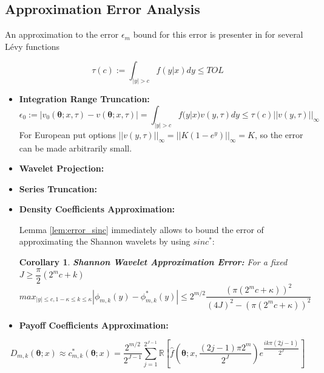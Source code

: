 \documentclass[12,twoside]{mammeTFM}
\newtheorem{cor}[thm]{Corollary}
\theoremstyle{definition}
\theoremstyle{remark}
\newcommand{\R}{\ensuremath{\mathbb{R}}}
\begin{document}
\subsection{Approximation Error Analysis} \label{subsec:approximation_error}
An approximation to the error $\epsilon_m$ bound for this error is presenter in \cite{mar17} for several L\'evy functions

\begin{equation}
\tau(c):= \int_{|y| > c} f(y|x) dy \leq TOL
\end{equation}

\begin{itemize}
\item \textbf{Integration Range Truncation: }
\begin{equation}
\epsilon_{0} := 
\left| v_0(\boldsymbol{\theta}; x, \tau) - v(\boldsymbol{\theta}; x, \tau) \right| = 
\int_{|y| > c} 
f(y|x) v(y, \tau) 
dy \leq \tau(c) ||v(y, \tau)||_{\infty}
\end{equation}
For European put options $ ||v(y, \tau)||_{\infty} = ||K (1 - e^y)||_{\infty} = K $, so the error can be made arbitrarily small.
\item \textbf{Wavelet Projection:}



\item \textbf{Series Truncation: }

\item \textbf{Density Coefficients Approximation: }

Lemma \ref{lem:error_sinc} immediately allows to bound the error of approximating the Shannon wavelets by using $sinc^{*}$:
\begin{cor} \label{cor:error_shannon_wavelets} \textbf{Shannon Wavelet Approximation Error:}
For a fixed $J \geq \dfrac{\pi}{2}(2^m c + k)$
\begin{equation}
max_{|y| \leq c, 1 - \kappa \leq k \leq \kappa} \left| \phi_{m,k}(y) - \phi^{*}_{m,k}(y) \right| \leq 2^{m/2}\dfrac{(\pi(2^m c + \kappa))^2}{(4J)^2 - (\pi(2^m c + \kappa))^2}
\end{equation}
\end{cor}
\item \textbf{Payoff Coefficients Approximation: }
\end{itemize}

\begin{equation}
D_{m,k}(\boldsymbol{\theta}; x) \approx c^*_{m,k} (\boldsymbol{\theta}; x) = \dfrac{2^{m/2}}{2^{J-1}} \sum_{j=1}^{2^{J-1}} \R \left[\hat{f}\left(\boldsymbol{\theta}; x, \dfrac{(2j - 1) \pi 2^m}{2^J}\right) e^{\dfrac{ik\pi(2j-1)}{2^J}}\right] 
\end{equation}
\end{document}
